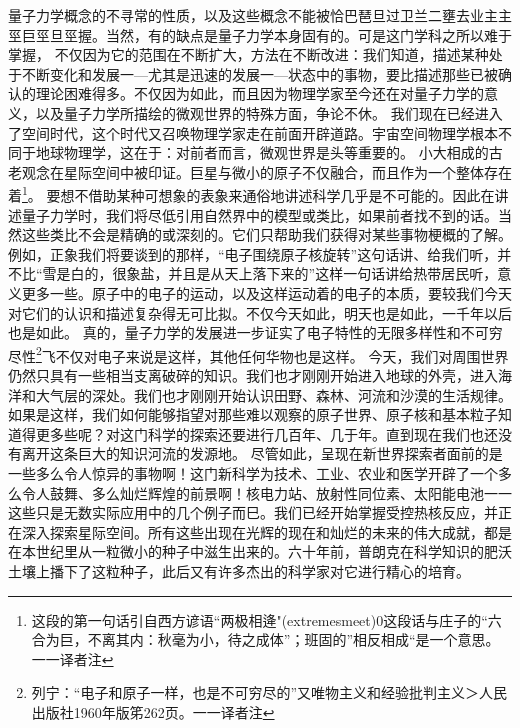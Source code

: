 量子力学概念的不寻常的性质，以及这些概念不能被恰巴琶旦过卫兰二壅去业主主巠巨巠旦巠握。当然，有的缺点是量子力学本身固有的。可是这门学科之所以难于掌握，
不仅因为它的范围在不断扩大，方法在不断改进：我们知道，描述某种处于不断变化和发展一—尤其是迅速的发展一—状态中的事物，要比描述那些已被确认的理论困难得多。不仅因为如此，而且因为物理学家至今还在对量子力学的意义，以及量子力学所描绘的微观世界的特殊方面，争论不休。
我们现在已经进入了空间时代，这个时代又召唤物理学家走在前面开辟道路。宇宙空间物理学根本不同于地球物理学，这在于：对前者而言，微观世界是头等重要的。
小大相成的古老观念在星际空间中被印证。巨星与微小的原子不仅融合，而且作为一个整体存在着\footnote{这段的第一句话引自西方谚语“两极相逄"(extremesmeet)0这段话与庄子的“六合为巨，不离其内：秋毫为小，待之成体”；班固的”相反相成“是一个意思。一一译者注}。
要想不借助某种可想象的表象来通俗地讲述科学几乎是不可能的。因此在讲述量子力学时，我们将尽低引用自然界中的模型或类比，如果前者找不到的话。当然这些类比不会是精确的或深刻的。它们只帮助我们获得对某些事物梗概的了解。
例如，正象我们将要谈到的那样，“电子围绕原子核旋转”这句话讲、给我们听，并不比“雪是白的，很象盐，并且是从天上落下来的”这样一句话讲给热带居民听，意义更多一些。原子中的电子的运动，以及这样运动着的电子的本质，要较我们今天对它们的认识和描述复杂得无可比拟。不仅今天如此，明天也是如此，一千年以后也是如此。
真的，量子力学的发展进一步证实了电子特性的无限多样性和不可穷尽性\footnote{列宁：“电子和原子一样，也是不可穷尽的”又唯物主义和经验批判主义＞人民出版社1960年版笫262页。一一译者注}飞不仅对电子来说是这样，其他任何华物也是这样。
今天，我们对周围世界仍然只具有一些相当支离破碎的知识。我们也才刚刚开始进入地球的外壳，进入海洋和大气层的深处。我们也才刚刚开始认识田野、森林、河流和沙漠的生活规律。
如果是这样，我们如何能够指望对那些难以观察的原子世界、原子核和基本粒子知道得更多些呢？对这门科学的探索还要进行几百年、几于年。直到现在我们也还没有离开这条巨大的知识河流的发源地。
尽管如此，呈现在新世界探索者面前的是一些多么令人惊异的事物啊！这门新科学为技术、工业、农业和医学开辟了一个多么令人鼓舞、多么灿烂辉煌的前景啊！核电力站、放射性同位素、太阳能电池一一这些只是无数实际应用中的几个例子而巳。我们已经开始掌握受控热核反应，并正在深入探索星际空间。所有这些出现在光辉的现在和灿烂的未来的伟大成就，都是在本世纪里从一粒微小的种子中滋生出来的。六十年前，普朗克在科学知识的肥沃土壤上播下了这粒种子，此后又有许多杰出的科学家对它进行精心的培育。
